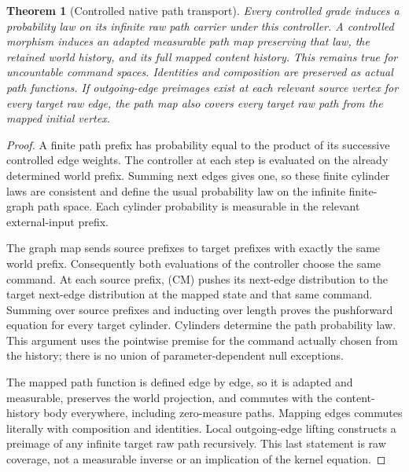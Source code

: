 \documentclass[11pt]{article}
\newtheorem{theorem}{Theorem}[section]
\begin{document}
\begin{theorem}[Controlled native path transport]\label{content:controlledpath}
Every controlled grade induces a probability law on its infinite raw path carrier under this controller. A controlled morphism induces an adapted measurable path map preserving that law, the retained world history, and its full mapped content history. This remains true for uncountable command spaces. Identities and composition are preserved as actual path functions. If outgoing-edge preimages exist at each relevant source vertex for every target raw edge, the path map also covers every target raw path from the mapped initial vertex.
\end{theorem}
\begin{proof}
A finite path prefix has probability equal to the product of its successive controlled edge weights. The controller at each step is evaluated on the already determined world prefix. Summing next edges gives one, so these finite cylinder laws are consistent and define the usual probability law on the infinite finite-graph path space. Each cylinder probability is measurable in the relevant external-input prefix.

The graph map sends source prefixes to target prefixes with exactly the same world prefix. Consequently both evaluations of the controller choose the same command. At each source prefix, (CM) pushes its next-edge distribution to the target next-edge distribution at the mapped state and that same command. Summing over source prefixes and inducting over length proves the pushforward equation for every target cylinder. Cylinders determine the path probability law. This argument uses the pointwise premise for the command actually chosen from the history; there is no union of parameter-dependent null exceptions.

The mapped path function is defined edge by edge, so it is adapted and measurable, preserves the world projection, and commutes with the content-history body everywhere, including zero-measure paths. Mapping edges commutes literally with composition and identities. Local outgoing-edge lifting constructs a preimage of any infinite target raw path recursively. This last statement is raw coverage, not a measurable inverse or an implication of the kernel equation.
\end{proof}
\end{document}

